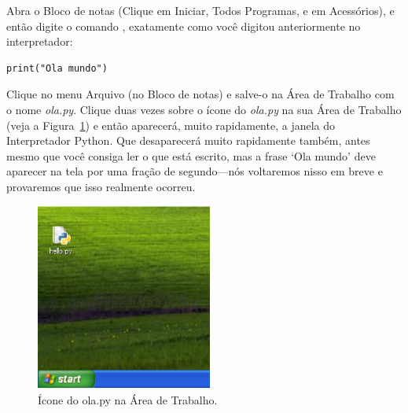\begin{WINDOWS}
Abra o Bloco de notas (Clique em Iniciar, Todos Programas, e em Acessórios), e então digite o comando , exatamente como você digitou anteriormente no interpretador:

\begin{listing}
\begin{verbatim}
print("Ola mundo")
\end{verbatim}
\end{listing}

Clique no menu Arquivo (no Bloco de notas) e salve-o na Área de Trabalho com o nome \emph{ola.py}. Clique duas vezes sobre o ícone do \emph{ola.py} na sua Área de Trabalho (veja a Figura~\ref{fig5}) e então aparecerá, muito rapidamente, a janela do Interpretador Python. Que desaparecerá muito rapidamente também, antes mesmo que você consiga ler o que está escrito, mas a frase `Ola mundo' deve aparecer na tela por uma fração de segundo---nós voltaremos nisso em breve e provaremos que isso realmente ocorreu.\\

\begin{figure}
\begin{center}
\includegraphics[width=58mm]{eps/figure5.eps}
\end{center}
\caption{Ícone do ola.py na Área de Trabalho.}\label{fig5}
\end{figure}
\end{WINDOWS}

